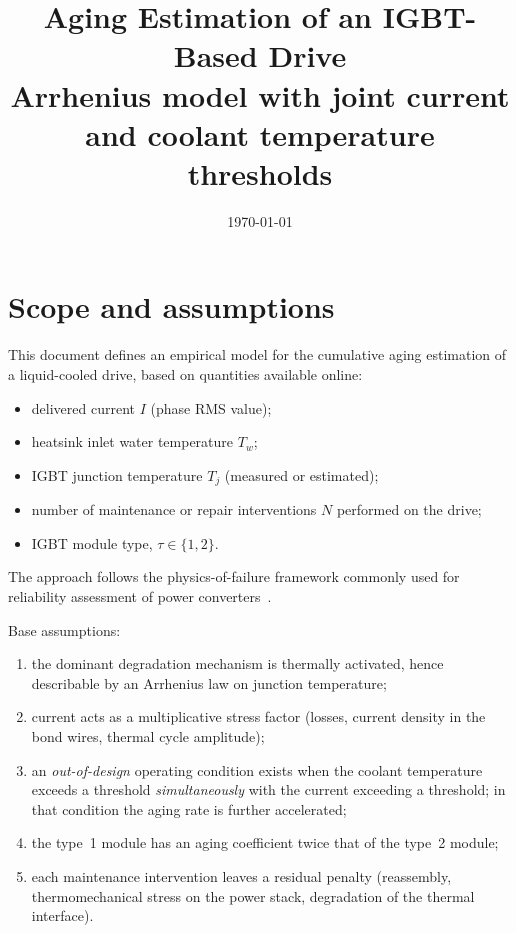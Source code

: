 \documentclass[11pt,a4paper]{article}
\title{Aging Estimation of an IGBT-Based Drive\\
\large Arrhenius model with joint current and coolant temperature thresholds}
\author{}
\date{\today}
\begin{document}
\maketitle

\section{Scope and assumptions}

This document defines an empirical model for the cumulative aging estimation of
a liquid-cooled drive, based on quantities available online:

\begin{itemize}
  \item delivered current $I$ (phase RMS value);
  \item heatsink inlet water temperature $T_w$;
  \item IGBT junction temperature $T_j$ (measured or estimated);
  \item number of maintenance or repair interventions $N$ performed on the
        drive;
  \item IGBT module type, $\tau \in \{1,2\}$.
\end{itemize}

The approach follows the physics-of-failure framework commonly used for
reliability assessment of power converters~\cite{wang2013,ma2016,lutz2018}.

Base assumptions:

\begin{enumerate}
  \item the dominant degradation mechanism is thermally activated, hence
        describable by an Arrhenius law on junction temperature;
  \item current acts as a multiplicative stress factor (losses, current density
        in the bond wires, thermal cycle amplitude);
  \item an \emph{out-of-design} operating condition exists when the coolant
        temperature exceeds a threshold \emph{simultaneously} with the current
        exceeding a threshold; in that condition the aging rate is further
        accelerated;
  \item the type~1 module has an aging coefficient twice that of the type~2
        module;
  \item each maintenance intervention leaves a residual penalty (reassembly,
        thermomechanical stress on the power stack, degradation of the thermal
        interface).
\end{enumerate}
\end{document}
